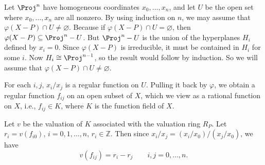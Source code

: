 {Let $\Proj^n$ have homogeneous coordinates $x_0,\ldots,x_n$, and let $U$ be the open set where $x_0,\ldots,x_n$ are all nonzero. By using induction on $n$, we may assume that $\varphi(X-P)\cap U\ne\varnothing$. Because if $\varphi(X-P)\cap U=\varnothing$, then $\varphi(X-P)\subseteq\Proj^n-U$. But $\Proj^n-U$ is the union of the hyperplanes $H_i$ defined by $x_i=0$. Since $\varphi(X-P)$ is irreducible, it must be contained in $H_i$ for some $i$. Now $H_i\cong\Proj^{n-1}$, so the result would follow by induction. So we will assume that $\varphi(X-P)\cap U\ne\varnothing$.

For each $i,j$, $x_i/x_j$ is a regular function on $U$. Pulling it back by $\varphi$, we obtain a regular function $f_{ij}$ on an open subset of $X$, which we view as a rational function on $X$, i.e., $f_{ij}\in K$, where $K$ is the function field of $X$.

Let $v$ be the valuation of $K$ associated with the valuation ring $R_P$. Let $r_i=v(f_{i0})$, $i=0,1,\ldots,n$, $r_i\in\mathbb Z$. Then since $x_i/x_j=(x_i/x_0)/(x_j/x_0)$, we have
\[
v(f_{ij})=r_i-r_j\qquad i,j=0,\ldots,n.
\]}
